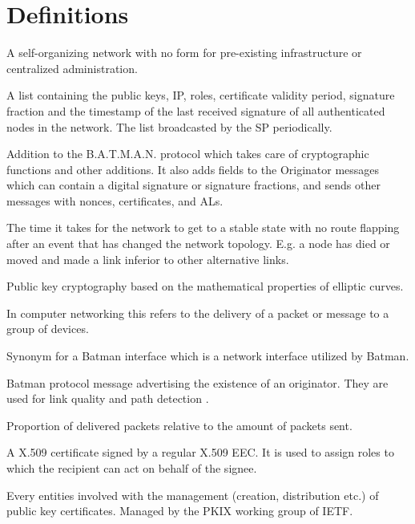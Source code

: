\chapter*{Definitions}

\begin{acronym}

		A self-organizing network with no form for pre-existing infrastructure or centralized administration.

	A list containing the public keys, IP, roles, certificate validity period, signature fraction and the timestamp of the last received signature of all authenticated nodes in the network. The list broadcasted by the SP periodically.


	Addition to the B.A.T.M.A.N. protocol which takes care of cryptographic functions and other additions. It also adds fields to the Originator messages which can contain a digital signature or signature fractions, and sends other messages with nonces, certificates, and ALs.


	The time it takes for the network to get to a stable state with no route flapping after an event that has changed the network topology. E.g. a node has died or moved and made a link inferior to other alternative links.

	Public key cryptography based on the mathematical properties of elliptic curves.

	In computer networking this refers to the delivery of a packet or message to a group of devices.

	Synonym for a Batman interface which is a network interface utilized by Batman.

	Batman protocol message advertising the existence of an originator. They are used for link quality and path detection \cite{batman_rfc}. %

	Proportion of delivered packets relative to the amount of packets sent.

	A X.509 certificate signed by a regular X.509 EEC. It is used to assign roles to which the recipient can act on behalf of the signee.

	Every entities involved with the management (creation, distribution etc.) of public key certificates. Managed by the PKIX working group of IETF.


\end{acronym}
